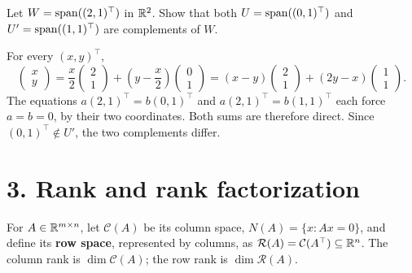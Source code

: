 \begin{example}\label{example:03:complements}
Let \(W=\operatorname{span}((2,1)^\top)\) in \(\mathbb R^2\). Show that both
\(U=\operatorname{span}((0,1)^\top)\) and \(U'=\operatorname{span}((1,1)^\top)\) are complements of \(W\).

For every \((x,y)^\top\),
\[
\begin{pmatrix}x\\y\end{pmatrix}
=\frac{x}{2}\begin{pmatrix}2\\1\end{pmatrix}
+\left(y-\frac{x}{2}\right)\begin{pmatrix}0\\1\end{pmatrix}
=(x-y)\begin{pmatrix}2\\1\end{pmatrix}
+(2y-x)\begin{pmatrix}1\\1\end{pmatrix}.
\]
The equations \(a(2,1)^\top=b(0,1)^\top\) and
\(a(2,1)^\top=b(1,1)^\top\) each force \(a=b=0\), by their two coordinates.
Both sums are therefore direct. Since \((0,1)^\top\notin U'\),
the two complements differ.
\end{example}

\section*{3. Rank and rank factorization}

For \(A\in\mathbb R^{m\times n}\), let \(\mathcal C(A)\) be its column space,
\(N(A)=\{x:Ax=0\}\), and define its \textbf{row space}, represented by columns,
as \(\mathcal R(A)=\mathcal C(A^\top)\subseteq\mathbb R^n\).
The column rank is \(\dim\mathcal C(A)\); the row rank is \(\dim\mathcal R(A)\).

